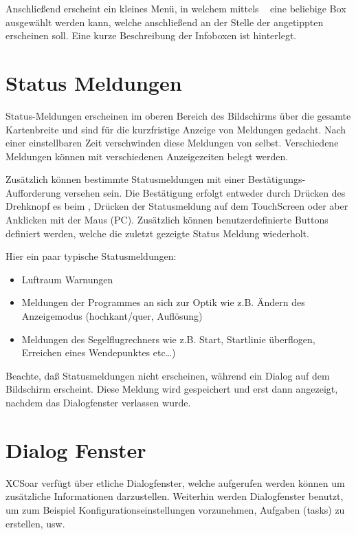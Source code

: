 Anschließend erscheint ein kleines Menü, in welchem mittels  \blink~    eine beliebige Box ausgewählt werden kann, welche anschließend  an der Stelle der angetippten erscheinen soll. 
Eine kurze Beschreibung der Infoboxen ist hinterlegt.



\section{Status Meldungen}
Status-Meldungen erscheinen im oberen Bereich des Bildschirms über die gesamte Kartenbreite und sind für die kurzfristige Anzeige von Meldungen gedacht. Nach einer einstellbaren Zeit verschwinden diese Meldungen von selbst. Verschiedene Meldungen können mit verschiedenen Anzeigezeiten belegt werden.

Zusätzlich können bestimmte Statusmeldungen mit einer Bestätigungs-Aufforderung versehen sein.
Die Bestätigung erfolgt entweder durch Drücken des Drehknopf es beim \al, Drücken der Statusmeldung auf dem TouchScreen oder aber Anklicken mit der Maus (\textsf{PC}).  Zusätzlich können benutzerdefinierte Buttons definiert werden, welche die zuletzt gezeigte Status Meldung wiederholt.

Hier ein paar typische Statusmeldungen:
\begin{itemize}
\item Luftraum Warnungen
\item Meldungen der Programmes an sich zur Optik wie z.B. Ändern des Anzeigemodus (hochkant/quer, Auflösung)
\item Meldungen des Segelflugrechners wie z.B. Start, Startlinie überflogen, Erreichen eines Wendepunktes etc\dots  )
\end{itemize}

Beachte, daß Statusmeldungen nicht erscheinen, während ein Dialog auf dem Bildschirm erscheint. Diese Meldung wird gespeichert und erst dann angezeigt, nachdem das Dialogfenster verlassen wurde.

\section{Dialog Fenster}\label{sec:dialog-windows}

\textsf{XCSoar} verfügt über etliche Dialogfenster, welche aufgerufen werden können um zusätzliche Informationen darzustellen. Weiterhin werden Dialogfenster benutzt, um zum Beispiel Konfigurationseinstellungen vorzunehmen, Aufgaben (tasks) zu erstellen, usw.\

